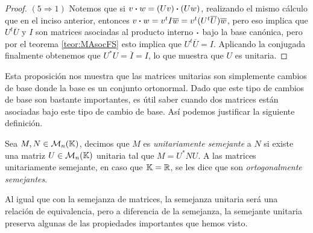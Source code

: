 \begin{proof}
  \medskip\noindent
  $(5 \Rightarrow 1)$ Notemos que si $v\boldsymbol\cdot w  = (Uv) \boldsymbol\cdot (Uw)$, realizando el mismo cálculo que en el inciso anterior, entonces $v\boldsymbol\cdot w = v^t I \overline{w} = v^t (U^t \overline{U}) \overline{w}$, pero eso implica que $U^t \overline{U}$ y $I$ son matrices asociadas al producto interno $\boldsymbol\cdot$ bajo la base canónica, pero por el teorema \ref{teor:MAsocFS} esto implica que $U^t \overline{U} = I$. Aplicando la conjugada finalmente obtenemos que $U^* U = \overline{I} = I$, lo que muestra que $U$ es unitaria.
\end{proof}

Esta proposición nos muestra que las matrices unitarias son simplemente cambios de base donde la base es un conjunto ortonormal. Dado que este tipo de cambios de base son bastante importantes, es útil saber cuando dos matrices están asociadas bajo este tipo de cambio de base. Así podemos justificar la siguiente definición.

\begin{defi}
  Sea $M,N \in \mathcal{M}_n(\mathbb{K})$, decimos que $M$ es \emph{unitariamente semejante} a $N$ si existe una matriz $U\in \mathcal{M}_n(\mathbb{K})$ unitaria tal que $M = U^* N U$. A las matrices unitariamente semejante, en caso que $\mathbb{K} = \mathbb{R}$, se les dice que son \emph{ortogonalmente semejantes}.
\end{defi}

Al igual que con la semejanza de matrices, la semejanza unitaria será una relación de equivalencia, pero a diferencia de la semejanza, la semejante unitaria preserva algunas de las propiedades importantes que hemos visto.

